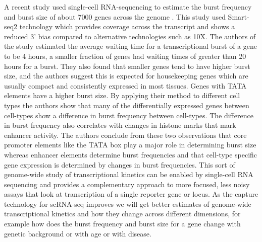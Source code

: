 A recent study used single-cell RNA-sequencing to estimate the burst frequency and burst size of about 7000 genes across the genome \cite{larsson2019n}. This study used Smart-seq2 technology which provides coverage across the transcript and shows a reduced 3' bias compared to alternative technologies such as 10X. \cite{picelli2013nm} The authors of the study estimated the average waiting time for a transcriptional burst of a gene to be 4 hours, a smaller fraction of genes had waiting times of greater than 20 hours for a burst. They also found that smaller genes tend to have higher burst size, and the authors suggest this is expected for housekeeping genes which are usually compact and consistently expressed in most tissues. Genes with TATA elements have a higher burst size. By applying their method to different cell types the authors show that many of the differentially expressed genes between cell-types show a difference in burst frequency between cell-types. The difference in burst frequency also correlates with changes in histone marks that mark enhancer activity. The authors conclude from these two observations that core promoter elements like the TATA box play a major role in determining burst size whereas enhancer elements determine burst frequencies and that cell-type specific gene expression is determined by changes in burst frequencies. This sort of genome-wide study of transcriptional kinetics can be enabled by single-cell RNA sequencing and provides a complementary approach to more focused, less noisy assays that look at transcription of a single reporter gene or locus. As the capture technology for scRNA-seq improves we will get better estimates of genome-wide transcriptional kinetics and how they change across different dimensions, for example how does the burst frequency and burst size for a gene change with genetic background or with age or with disease.

